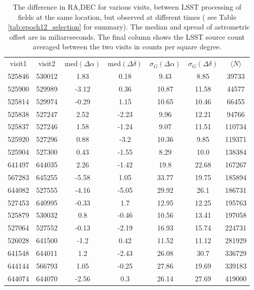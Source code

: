 \documentclass[DM,lsstdraft,toc,usenatbib]{lsstdoc}
\begin{document}
\begin{table}
\centering
\caption{The difference in RA,DEC for various visits, between LSST processing of fields at the same location, but observed at different times ( see Table ~\ref{tab:epoch12_selection} for summary). The median and spread of astrometric offset are in  miliarcseconds. The final column shows the LSST source count averaged between the two visits in counts per square degree.}
\label{tab:radec_lsst_lsst}
\begin{tabular}{ccccccc}
visit1 & visit2 & $\mathrm{med}(\Delta\alpha)$ & $\mathrm{med}(\Delta\delta)$ & $\sigma_{G}(\Delta\alpha)$ & $\sigma_{G}(\Delta\delta)$ & $\langle N \rangle$ \\
525846 & 530012 & 1.83 & 0.18 & 9.43 & 8.85 & 39733 \\
525900 & 529989 & -3.12 & 0.36 & 10.87 & 11.58 & 44577 \\
525814 & 529974 & -0.29 & 1.15 & 10.65 & 10.46 & 66455 \\
525838 & 527247 & 2.52 & -2.23 & 9.96 & 12.21 & 94766 \\
525837 & 527246 & 1.58 & -1.24 & 9.07 & 11.51 & 110734 \\
525920 & 527296 & 0.88 & -3.2 & 10.36 & 9.85 & 119371 \\
525904 & 527300 & 0.43 & -1.55 & 8.29 & 10.0 & 138384 \\
641497 & 644035 & 2.26 & -1.42 & 19.8 & 22.68 & 167267 \\
567283 & 645255 & -5.58 & 1.05 & 33.77 & 19.75 & 185894 \\
644082 & 527555 & -4.16 & -5.05 & 29.92 & 26.1 & 186731 \\
527453 & 640995 & -0.33 & 1.7 & 12.95 & 12.25 & 195763 \\
525879 & 530032 & 0.8 & -0.46 & 10.56 & 13.41 & 197058 \\
527064 & 527552 & -0.13 & -2.19 & 16.93 & 15.74 & 224731 \\
526028 & 641500 & -1.2 & 0.42 & 11.52 & 11.12 & 281929 \\
641548 & 644011 & 1.2 & -2.43 & 26.08 & 30.7 & 336729 \\
644144 & 566793 & 1.05 & -0.25 & 27.86 & 19.69 & 339183 \\
644074 & 644070 & -2.56 & 0.3 & 26.14 & 27.69 & 419000 \\
\end{tabular}
\end{table}
\end{document}
